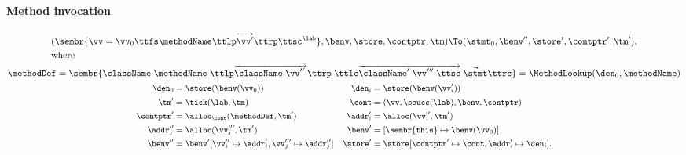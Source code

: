 \begin{figure}
\paragraph{Method invocation}
\begin{gather*}
\begin{split}
  &(
  \sembr{\vv = \vv_0 \ttfs \methodName \ttlp
    \overrightarrow{\vv'}
\ttrp \ttsc^\lab},
  \benv,
  \store,
  \contptr,
  \tm
  )
  \To
  (
  \stmt_0,
  \benv'',
  \store',
  \contptr',
  \tm'
  )\text{,}\\  
  &\text{where }
\end{split}
  \\
  \methodDef = 
  \sembr{\className\; \methodName\; \ttlp 
   \overrightarrow{
   \className\; \vv''\;
  }
  \ttrp\;
  \ttlc
  \overrightarrow{\className'\; \vv'''\; \ttsc}\;
  \vec{\stmt}
  \ttrc}
  = \MethodLookup(\den_0,\methodName)\\
\begin{small}\begin{align*}
  \den_0 &= \store(\benv(\vv_0))
  &
  \den_i &= \store(\benv(\vv'_i))
  \\
  \tm' &= \tick(\lab,\tm)
  &
  \cont &= (\vv,\ssucc(\lab), \benv, \contptr)
  \\
  \contptr' &= \alloc_\cont(\methodDef,\tm')
  &
  \addr'_i &= \alloc(\vv_i'',\tm')
  \\
  \addr''_j &= \alloc(\vv_j''',\tm')
  &
  \benv' &= [\sembr{\tt this} \mapsto \benv(\vv_0)]
  \\
  \benv'' &= \benv'[\vv_i'' \mapsto \addr_i', \vv'''_j \mapsto \addr_j'']
  &
  \store' &= \store [\contptr' \mapsto \cont, \addr'_i \mapsto \den_i]
  \text.
\end{align*}\end{small}\end{gather*}






\end{figure}
